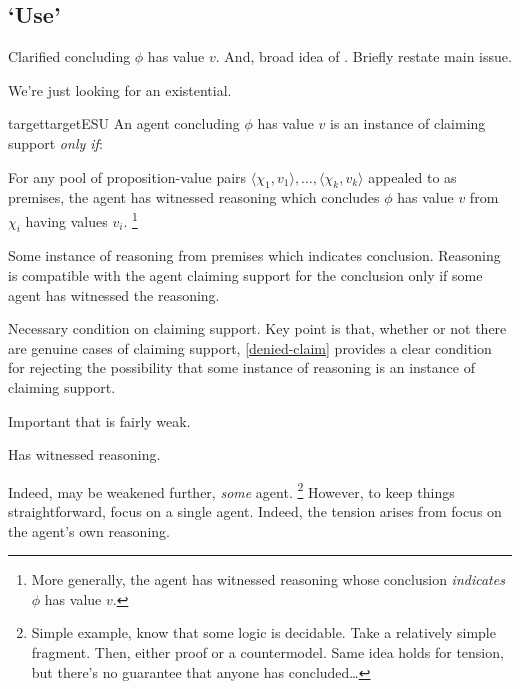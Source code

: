 \subsection{`Use'}
\label{sec:issue-refined}

\begin{note}
  Clarified concluding \(\phi\) has value \(v\).
  And, broad idea of .
  Briefly restate main issue.

  We're just looking for an existential.
\end{note}

\begin{note}
  \begin{restatable}{target}{targetESU}
    \label{denied-claim}
    An agent concluding \(\phi\) has value \(v\) is an instance of claiming support \emph{only if}:

    For any pool of proposition-value pairs \(\langle \chi_{1},v_{1} \rangle,\dots,\langle \chi_{k},v_{k} \rangle\) appealed to as premises, the agent has witnessed reasoning which concludes \(\phi\) has value \(v\) from \(\chi_{i}\) having values \(v_{i}\).\nolinebreak
    \footnote{More generally, the agent has witnessed reasoning whose conclusion \emph{indicates} \(\phi\) has value \(v\).}
  \end{restatable}


  Some instance of reasoning from premises which indicates conclusion.
  Reasoning is compatible with the agent claiming support for the conclusion only if some agent has witnessed the reasoning.

  Necessary condition on claiming support.
  Key point is that, whether or not there are genuine cases of claiming support, \autoref{denied-claim} provides a clear condition for rejecting the possibility that some instance of reasoning is an instance of claiming support.
\end{note}

\begin{note}
  Important that \ESU{} is fairly weak.

  Has witnessed reasoning.

  Indeed, \ESU{} may be weakened further, \emph{some} agent.\nolinebreak
  \footnote{
    Simple example, know that some logic is decidable.
    Take a relatively simple fragment.
    Then, either proof or a countermodel.
    Same idea holds for tension, but there's no guarantee that anyone has concluded\dots
  }
  However, to keep things straightforward, focus on a single agent.
  Indeed, the tension arises from focus on the agent's own reasoning.
\end{note}

